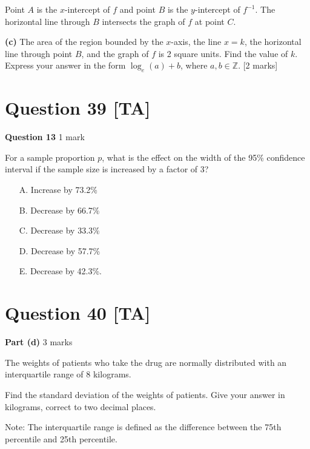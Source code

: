 \documentclass[10pt,a4paper]{article}
\begin{document}
Point $A$ is the $x$-intercept of $f$ and point $B$ is the $y$-intercept of $f^{-1}$. The horizontal line through $B$ intersects the graph of $f$ at point $C$.

\textbf{(c)} The area of the region bounded by the $x$-axis, the line $x = k$, the horizontal line through point $B$, and the graph of $f$ is 2 square units. Find the value of $k$. Express your answer in the form $\log_e(a) + b$, where $a, b \in \mathbb{Z}$. \hfill [2 marks]

\vspace{9\baselineskip}

\hrulefill

\section*{Question 39 [TA]}

\textbf{Question 13} \hfill 1 mark

For a sample proportion $p$, what is the effect on the width of the 95\% confidence interval if the sample size is increased by a factor of 3?

\begin{enumerate}
    \item[A.] Increase by 73.2\%
    \item[B.] Decrease by 66.7\%
    \item[C.] Decrease by 33.3\%
    \item[D.] Decrease by 57.7\%
    \item[E.] Decrease by 42.3\%.
\end{enumerate}

\vspace{9\baselineskip}

\hrulefill

\section*{Question 40 [TA]}

\textbf{Part (d)} \hfill 3 marks

The weights of patients who take the drug are normally distributed with an interquartile range of 8 kilograms.

Find the standard deviation of the weights of patients. Give your answer in kilograms, correct to two decimal places.

Note: The interquartile range is defined as the difference between the 75th percentile and 25th percentile.
\end{document}
